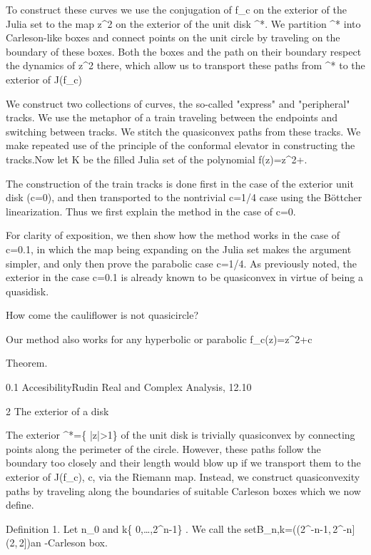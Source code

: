 \documentclass[12pt]{article}
\numberwithin{equation}{section}
\theoremstyle{remark}
\theoremstyle{definition}
\begin{document}
To construct these curves we use the conjugation of f_{c} on the exterior of the Julia set to the map z^{2} on the exterior of the unit disk \D^{*}. We partition \D^{*} into Carleson-like boxes and connect points on the unit circle by traveling on the boundary of these boxes. Both the boxes and the path on their boundary respect the dynamics of z^{2} there, which allow us to transport these paths from \D^{*} to the exterior of J(f_{c}) 

We construct two collections of curves, the so-called "express" and "peripheral" tracks. We use the metaphor of a train traveling between the endpoints and switching between tracks. We stitch the quasiconvex paths from these tracks. We make repeated use of the principle of the conformal elevator in constructing the tracks.Now let K be the filled Julia set of the polynomial f(z)=z^{2}+. 

The construction of the train tracks is done first in the case of the exterior unit disk (c=0), and then transported to the nontrivial c=1/4 case using the Böttcher linearization. Thus we first explain the method in the case of c=0. 

For clarity of exposition, we then show how the method works in the case of c=0.1, in which the map being expanding on the Julia set makes the argument simpler, and only then prove the parabolic case c=1/4. As previously noted, the exterior in the case c=0.1 is already known to be quasiconvex in virtue of being a quasidisk.

How come the cauliflower is not quasicircle?

Our method also works for any hyperbolic or parabolic f_{c}(z)=z^{2}+c 

Theorem. 

0.1 AccesibilityRudin Real and Complex Analysis, 12.10

2 The exterior of a disk

The exterior \D^{*}=\left\{ \left|z\right|>1\right\}  of the unit disk is trivially quasiconvex by connecting points along the perimeter of the circle. However, these paths follow the boundary too closely and their length would blow up if we transport them to the exterior of J(f_{c}), c, via the Riemann map. Instead, we construct quasiconvexity paths by traveling along the boundaries of suitable Carleson boxes which we now define.

Definition 1. Let n\in\N_{0} and k\in\left\{ 0,\ldots,2^{n}-1\right\} . We call the setB_{n,k}=\exp\left(\biggl(2^{-n-1},\,2^{-n}\biggl]\times\biggl(2\pi,\,2\pi\biggl]\right)an -Carleson box. 
\end{document}
